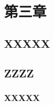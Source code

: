 

\chapter{第三章}\label{chapter3}
\vbox{}\vbox{}

\section{XXXXX}
\vbox{}



\vbox{}
\section{ZZZZ}
\vbox{}

\subsection{XXXXX}
















